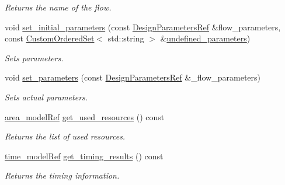 \begin{DoxyCompactItemize}
\begin{DoxyCompactList}\small\item\em Returns the name of the flow. \end{DoxyCompactList}\item 
void \hyperlink{classBackendFlow_abe677fcf55f872255367bf89e8923deb}{set\+\_\+initial\+\_\+parameters} (const \hyperlink{DesignParameters_8hpp_ae36bb1c4c9150d0eeecfe1f96f42d157}{Design\+Parameters\+Ref} \&flow\+\_\+parameters, const \hyperlink{classCustomOrderedSet}{Custom\+Ordered\+Set}$<$ std\+::string $>$ \&\hyperlink{classBackendFlow_a874c2f1cf929d2ab0cf742aceff21a9d}{undefined\+\_\+parameters})
\begin{DoxyCompactList}\small\item\em Sets parameters. \end{DoxyCompactList}\item 
void \hyperlink{classBackendFlow_a52ba6d2baaf1d67d2c5461c41a307822}{set\+\_\+parameters} (const \hyperlink{DesignParameters_8hpp_ae36bb1c4c9150d0eeecfe1f96f42d157}{Design\+Parameters\+Ref} \&\+\_\+flow\+\_\+parameters)
\begin{DoxyCompactList}\small\item\em Sets actual parameters. \end{DoxyCompactList}\item 
\hyperlink{area__model_8hpp_aec11e4e9b1b3afd49a437cb37df0abfb}{area\+\_\+model\+Ref} \hyperlink{classBackendFlow_ad80b5e5423a3df382940166a46989f7f}{get\+\_\+used\+\_\+resources} () const
\begin{DoxyCompactList}\small\item\em Returns the list of used resources. \end{DoxyCompactList}\item 
\hyperlink{time__model_8hpp_ae203bb7faf1c278333f76fcc6ebe412c}{time\+\_\+model\+Ref} \hyperlink{classBackendFlow_a92afaf21ef0bea7c282292bc1e05eb68}{get\+\_\+timing\+\_\+results} () const
\begin{DoxyCompactList}\small\item\em Returns the timing information. \end{DoxyCompactList}\end{DoxyCompactItemize}

